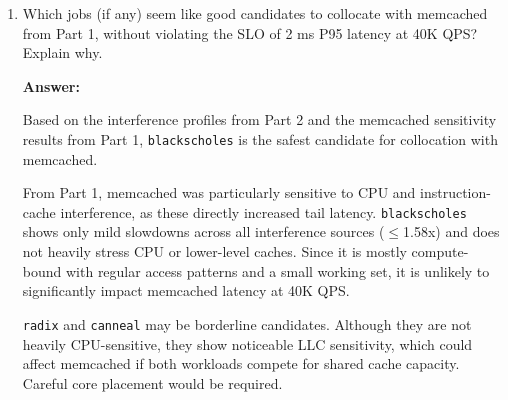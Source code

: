 \begin{enumerate}
\begin{enumerate}
\begin{itemize}
\textit{Explanation:} Radix sort processes a very large dataset across multiple passes. Since the dataset far exceeds cache capacity, it relies on streaming memory access. LLC interference increases cache misses and DRAM traffic, explaining the slowdown.

\item \texttt{streamcluster:} Streamcluster is sensitive to LLC (1.95x) and moderately affected by L1i and L2 interference.

\textit{Explanation:} The algorithm repeatedly computes distances between points and cluster centers. The working set does not fit entirely in lower-level caches, making it dependent on higher-level cache capacity. LLC interference causes repeated memory reloads.

\item \texttt{vips:} Vips shows consistent sensitivity across all interference types (around 1.6–1.8x), without a single dominant bottleneck.

\textit{Explanation:} Image processing involves large data arrays and continuous data movement. Although access patterns are regular, the dataset is large enough to stress caches and memory bandwidth. The workload therefore suffers under both compute and memory interference.

\end{itemize}

 \item Which jobs (if any) seem like good candidates to collocate with memcached from Part 1, without violating the SLO of 2 ms P95 latency at 40K QPS? Explain why.

\textbf{Answer:}

Based on the interference profiles from Part 2 and the memcached sensitivity results from Part 1, \texttt{blackscholes} is the safest candidate for collocation with memcached. 

From Part 1, memcached was particularly sensitive to CPU and instruction-cache interference, as these directly increased tail latency. \texttt{blackscholes} shows only mild slowdowns across all interference sources ($\leq$1.58x) and does not heavily stress CPU or lower-level caches. Since it is mostly compute-bound with regular access patterns and a small working set, it is unlikely to significantly impact memcached latency at 40K QPS.

\texttt{radix} and \texttt{canneal} may be borderline candidates. Although they are not heavily CPU-sensitive, they show noticeable LLC sensitivity, which could affect memcached if both workloads compete for shared cache capacity. Careful core placement would be required.


\end{enumerate}
\end{enumerate}
